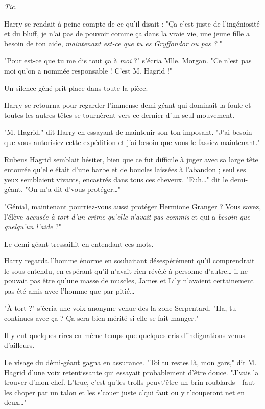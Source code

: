 \emph{Tic.} 

Harry se rendait à peine compte de ce qu'il disait : "Ça c'est juste de l'ingéniosité et du bluff, je n'ai pas de pouvoir comme ça dans la vraie vie, une jeune fille a besoin de ton aide, \emph{maintenant est-ce que tu es Gryffondor ou pas ?} "

"Pour est-ce que tu me dis tout ça à \emph{moi}  ?" s'écria Mlle. Morgan. "Ce n'est pas moi qu'on a nommée responsable ! C'est M. Hagrid !"

Un silence gêné prit place dans toute la pièce.

Harry se retourna pour regarder l'immense demi-géant qui dominait la foule et toutes les autres têtes se tournèrent vers ce dernier d'un seul mouvement.

"M. Hagrid," dit Harry en essayant de maintenir son ton imposant. "J'ai besoin que vous autorisiez cette expédition et j'ai besoin que vous le fassiez maintenant."

Rubeus Hagrid semblait hésiter, bien que ce fut difficile à juger avec sa large tête entourée qu'elle était d'une barbe et de boucles laissées à l'abandon ; seul ses yeux semblaient vivants, encastrés dans tous ces cheveux. "Euh…" dit le demi-géant. "On m'a dit d'vous protéger…"

"Génial, maintenant pourriez-vous aussi protéger Hermione Granger ? Vous savez, l'élève \emph{accusée à tort d'un crime qu'elle n'avait pas commis}  et qui a \emph{besoin que quelqu'un l'aide}  ?"

Le demi-géant tressaillit en entendant ces mots.

Harry regarda l'homme énorme en souhaitant désespérément qu'il comprendrait le sous-entendu, en espérant qu'il n'avait rien révélé à personne d'autre… il ne pouvait pas être qu'une masse de muscles, James et Lily n'avaient certainement pas été amis avec l'homme que par pitié…

"À tort ?" s'écria une voix anonyme venue des la zone Serpentard. "Ha, tu continues avec ça ? Ça sera bien mérité si elle se fait manger."

Il y eut quelques rires en même temps que quelques cris d'indignations venus d'ailleurs.

Le visage du démi-géant gagna en assurance. "Toi tu restes là, mon gars," dit M. Hagrid d'une voix retentissante qui essayait probablement d'être douce. "J'vais la trouver d'mon chef. L'truc, c'est qu'les trolls peuvt'être un brin roublards - faut les choper par un talon et les s'couer juste c'qui faut ou y t'couperont net en deux…"

